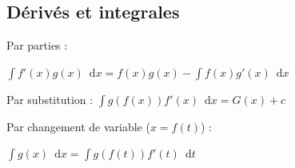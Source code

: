 \documentclass[landscape,a4paper]{article}
\newcommand{\eqentry}[1]{\(\displaystyle #1\)}
\newcommand{\dee}[1]{
  \,\,\,\mathrm{d}{#1}
}
\newcommand{\dx}{ \dee x }
\newcommand{\dt}{ \dee t }
\begin{document}
\begin{multicols}{4}
  \subsection{Dérivés et integrales}


  Par parties : 

  \(\displaystyle \int f'(x)g(x)\dx = f(x)g(x) - \int f(x)g'(x)\dx \)

  Par substitution : 
  \(\displaystyle \int g(f(x))f'(x)\dx = G(x) + c \)

  Par changement de variable (\(x=f(t)\)) : 

  \(\displaystyle \int g(x)\dx = \int g(f(t))f'(t) \dt \)


\end{multicols}
\end{document}
